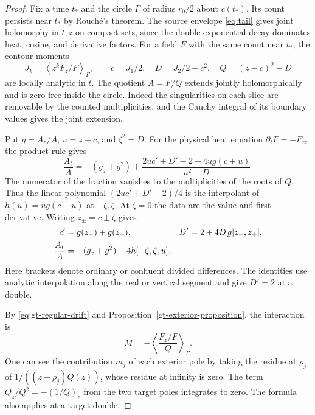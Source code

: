 \begin{proof}
Fix a time \(t_*\) and the circle \(\Gamma\) of radius \(r_0/2\)
about \(c(t_*)\). Its count persists near \(t_*\) by Rouché's theorem.
The source envelope \eqref{eq:tail} gives joint holomorphy in \(t,z\)
on compact sets, since the double-exponential decay dominates heat,
cosine, and derivative factors. For a field \(F\) with the same
count near \(t_*\), the contour moments
\[
 J_k=\left\langle z^k F_z/F\right\rangle_\Gamma,\qquad
 c=J_1/2,\quad D=J_2/2-c^2,\quad Q=(z-c)^2-D
\]
are locally analytic in \(t\). The quotient \(A=F/Q\) extends
jointly holomorphically and is zero-free inside the circle.
Indeed the singularities on each slice are removable by the
counted multiplicities, and the Cauchy integral of its boundary
values gives the joint extension.

Put \(g=A_z/A\), \(u=z-c\), and \(\zeta^2=D\). For the physical
heat equation \(\partial_t F=-F_{zz}\) the product rule gives
\[
 \frac{A_t}{A}=-(g_z+g^2)
      +\frac{2uc'+D'-2-4u g(c+u)}{u^2-D}.
\]
The numerator of the fraction vanishes to the multiplicities of
the roots of \(Q\). Thus the linear polynomial
\((2uc'+D'-2)/4\) is the interpolant of \(h(u)=u g(c+u)\)
at \(-\zeta,\zeta\). At \(\zeta=0\) the data are the value and
first derivative. Writing \(z_\pm=c\pm\zeta\) gives
\begin{align}
 c'&=g(z_-)+g(z_+),&
 D'&=2+4D\,g[z_-,z_+],\notag\\
 \frac{A_t}{A}&=-(g_z+g^2)-4h[-\zeta,\zeta,u].
 \label{gt-deflated-pde}
\end{align}
Here brackets denote ordinary or confluent divided differences.
The identities use analytic interpolation along the real or vertical
segment and give \(D'=2\) at a double.

By \eqref{eq:gt-regular-drift} and Proposition~\ref{gt-exterior-proposition},
the interaction is
\[
 M=-\left\langle \frac{F_z/F}{Q}\right\rangle_\Gamma .
\]
One can see the contribution \(m_j\) of each exterior pole by taking
the residue at \(\rho_j\) of \(1/((z-\rho_j)Q(z))\), whose residue
at infinity is zero. The term \(Q_z/Q^2=-(1/Q)_z\) from the two
target poles integrates to zero. The formula also applies at a
target double.


\end{proof}
